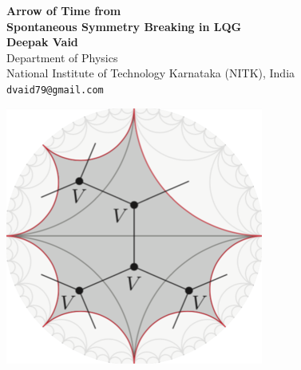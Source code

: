 \documentclass[a0,portrait]{a0poster}
\begin{document}
\begin{minipage}[b]{0.75\linewidth}
\veryHuge \color{NavyBlue} \textbf{Arrow of Time from \\ [0.5cm] Spontaneous Symmetry Breaking in LQG} \color{Black}\\[0.5cm] %
\huge \textbf{Deepak Vaid}\\[0.5cm] %
\Large Department of Physics \\ National Institute of Technology Karnataka (NITK), India\\[0.4cm] %
\Large \texttt{dvaid79@gmail.com}\\
\end{minipage}
%
\hspace*{-5in}
\begin{minipage}[b]{0.125\linewidth}
\includegraphics[width=\linewidth]{evonet18_logo.png}
\end{minipage}
\end{document}
